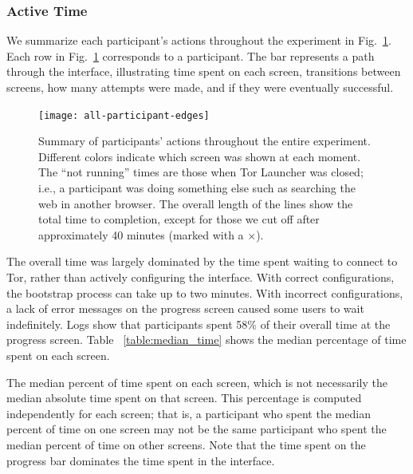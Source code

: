 \documentclass[USenglish,oneside,twocolumn]{article}
\begin{document}
\subsubsection{Active Time} 
We summarize each participant's actions throughout the experiment in Fig.~\ref{fig:all-participant-edges}. Each row in Fig.~\ref{fig:all-participant-edges} corresponds to a participant. The bar represents a path through the interface, illustrating time spent on each screen, transitions between screens, how many attempts were made, and if they were eventually successful. 

\begin{figure}
\centering
\texttt{[image: all-participant-edges]}
\caption{
Summary of participants' actions throughout the entire experiment.
Different colors indicate which screen was shown at each moment.
The ``not running'' times are those when Tor Launcher was closed;
i.e., a participant was doing something else
such as searching the web in another browser.
The overall length of the lines show the total time to completion,
except for those we cut off after approximately 40 minutes
(marked with a $\times$).
}
\label{fig:all-participant-edges}
\end{figure}

The overall time was largely dominated by the time spent waiting to connect to Tor, rather than actively configuring the interface. With correct configurations, the bootstrap process can take up to two minutes.  With incorrect configurations, a lack of error messages on the progress screen caused some users to wait indefinitely.  Logs show that participants spent 58\% of their overall time at the progress screen. Table ~\ref{table:median_time} shows the median percentage of time spent on each screen. 

\begin{table}[t]
\centering

\caption{The median percent of time spent on each screen, which is not
necessarily the median absolute time spent on that screen. 
This percentage is computed independently for each screen; that is, a participant who spent the median percent 
of time on one screen may not be the same participant who spent the median percent
of time on other screens. Note that the time spent on the progress bar dominates the 
time spent in the interface.} 
\label{table:median_time}
\end{table}
\end{document}
